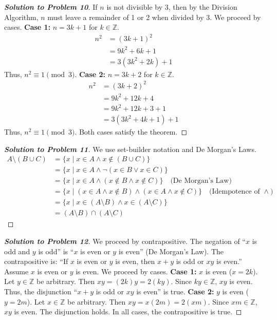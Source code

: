 \documentclass[11pt]{article}
\begin{document}
\begin{proof}[\textbf{Solution to Problem 10}]
If $n$ is not divisible by 3, then by the Division Algorithm, $n$ must leave a remainder of 1 or 2 when divided by 3. We proceed by cases.
\textbf{Case 1:} $n = 3k + 1$ for $k \in \mathbb{Z}$.
\begin{align*}
n^2 &= (3k + 1)^2 \\
&= 9k^2 + 6k + 1 \\
&= 3(3k^2 + 2k) + 1
\end{align*}
Thus, $n^2 \equiv 1 \pmod 3$.
\textbf{Case 2:} $n = 3k + 2$ for $k \in \mathbb{Z}$.
\begin{align*}
n^2 &= (3k + 2)^2 \\
&= 9k^2 + 12k + 4 \\
&= 9k^2 + 12k + 3 + 1 \\
&= 3(3k^2 + 4k + 1) + 1
\end{align*}
Thus, $n^2 \equiv 1 \pmod 3$. Both cases satisfy the theorem.
\end{proof}

\begin{proof}[\textbf{Solution to Problem 11}]
We use set-builder notation and De Morgan's Laws.
\begin{align*}
A \setminus (B \cup C) &= \{ x \mid x \in A \land x \notin (B \cup C) \} \\
&= \{ x \mid x \in A \land \neg(x \in B \lor x \in C) \} \\
&= \{ x \mid x \in A \land (x \notin B \land x \notin C) \} \quad \text{(De Morgan's Law)} \\
&= \{ x \mid (x \in A \land x \notin B) \land (x \in A \land x \notin C) \} \quad \text{(Idempotence of } \land \text{)} \\
&= \{ x \mid x \in (A \setminus B) \land x \in (A \setminus C) \} \\
&= (A \setminus B) \cap (A \setminus C)
\end{align*}
\end{proof}

\begin{proof}[\textbf{Solution to Problem 12}]
We proceed by contrapositive. The negation of ``$x$ is odd and $y$ is odd'' is ``$x$ is even or $y$ is even'' (De Morgan's Law). The contrapositive is: ``If $x$ is even or $y$ is even, then $x+y$ is odd or $xy$ is even.''
Assume $x$ is even or $y$ is even. We proceed by cases.
\textbf{Case 1:} $x$ is even ($x = 2k$). Let $y \in \mathbb{Z}$ be arbitrary.
Then $xy = (2k)y = 2(ky)$. Since $ky \in \mathbb{Z}$, $xy$ is even. Thus, the disjunction ``$x+y$ is odd or $xy$ is even'' is true.
\textbf{Case 2:} $y$ is even ($y = 2m$). Let $x \in \mathbb{Z}$ be arbitrary.
Then $xy = x(2m) = 2(xm)$. Since $xm \in \mathbb{Z}$, $xy$ is even. The disjunction holds.
In all cases, the contrapositive is true.
\end{proof}
\end{document}
